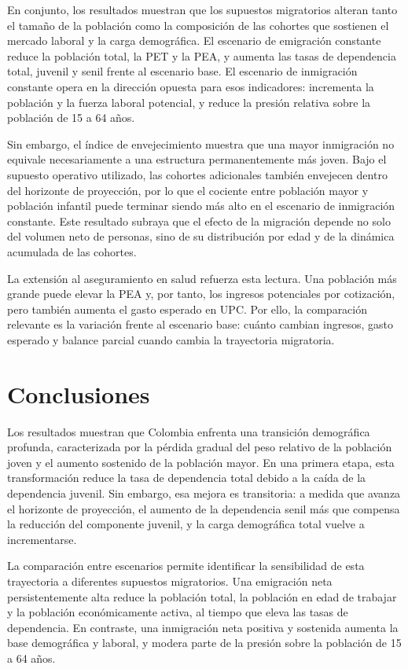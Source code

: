 \documentclass[12pt,a4paper]{article}
\begin{document}
En conjunto, los resultados muestran que los supuestos migratorios alteran tanto el tamaño de la población como la composición de las cohortes que sostienen el mercado laboral y la carga demográfica. El escenario de emigración constante reduce la población total, la PET y la PEA, y aumenta las tasas de dependencia total, juvenil y senil frente al escenario base. El escenario de inmigración constante opera en la dirección opuesta para esos indicadores: incrementa la población y la fuerza laboral potencial, y reduce la presión relativa sobre la población de 15 a 64 años.

Sin embargo, el índice de envejecimiento muestra que una mayor inmigración no equivale necesariamente a una estructura permanentemente más joven. Bajo el supuesto operativo utilizado, las cohortes adicionales también envejecen dentro del horizonte de proyección, por lo que el cociente entre población mayor y población infantil puede terminar siendo más alto en el escenario de inmigración constante. Este resultado subraya que el efecto de la migración depende no solo del volumen neto de personas, sino de su distribución por edad y de la dinámica acumulada de las cohortes.

La extensión al aseguramiento en salud refuerza esta lectura. Una población más grande puede elevar la PEA y, por tanto, los ingresos potenciales por cotización, pero también aumenta el gasto esperado en UPC. Por ello, la comparación relevante es la variación frente al escenario base: cuánto cambian ingresos, gasto esperado y balance parcial cuando cambia la trayectoria migratoria.

\section{Conclusiones}

Los resultados muestran que Colombia enfrenta una transición demográfica profunda, caracterizada por la pérdida gradual del peso relativo de la población joven y el aumento sostenido de la población mayor. En una primera etapa, esta transformación reduce la tasa de dependencia total debido a la caída de la dependencia juvenil. Sin embargo, esa mejora es transitoria: a medida que avanza el horizonte de proyección, el aumento de la dependencia senil más que compensa la reducción del componente juvenil, y la carga demográfica total vuelve a incrementarse.

La comparación entre escenarios permite identificar la sensibilidad de esta trayectoria a diferentes supuestos migratorios. Una emigración neta persistentemente alta reduce la población total, la población en edad de trabajar y la población económicamente activa, al tiempo que eleva las tasas de dependencia. En contraste, una inmigración neta positiva y sostenida aumenta la base demográfica y laboral, y modera parte de la presión sobre la población de 15 a 64 años.
\end{document}
